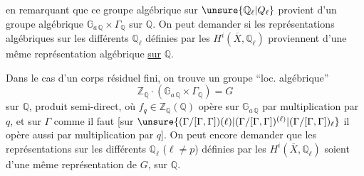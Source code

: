 en remarquant que ce groupe algébrique sur $\unsure{\mathbb Q_\ell|Q_\ell}$ provient d'un groupe algébrique  $\mathbb G_{a\,\mathbb Q}\times\Gamma_{\mathbb Q}$ sur $\mathbb Q$. On peut demander   si les représentations algébriques sur les différents $\mathbb Q_\ell$ définies par les $H^i(\overline X,\mathbb Q_\ell)$ proviennent d'une même représentation algébrique \uline{sur} $\mathbb Q$.
\margin{[N.B. \unsure{Même|M\textsuperscript{me}} la représentation induite de $\Gamma$ ne s'écrit pas en général sur $\mathbb Q$, si $i=1$ et si $X_K$ est une courbe elliptique sur $K$ ayant ``bonne réduction potentielle''.]}

Dans le cas d'un corps résiduel fini, on trouve un groupe ``loc. algébrique''
\[
 \mathbb Z_{\mathbb Q}\cdot(\mathbb G_{a\,\mathbb Q}\times\Gamma_{\mathbb Q})=G
\]
sur $\mathbb Q$, produit semi-direct, où  $f_q\in\mathbb Z_{\mathbb Q}(\mathbb Q)$ opère sur $\mathbb G_{a\,\mathbb Q}$  par multiplication par $q$, et sur $\Gamma$ comme il faut [sur $\unsure{(\Gamma/[\Gamma,\Gamma])(\ell)|(\Gamma/[\Gamma,\Gamma])^{(\ell)}|(\Gamma/[\Gamma,\Gamma])_\ell}$ il opère aussi par multiplication par $q$]. On peut encore demander que les représentations sur les différents $\mathbb Q_\ell$ ($\ell\ne p$) définies par les $H^i(\overline X,\mathbb Q_\ell)$ soient   d'une même représentation de $G$, sur $\mathbb Q$.
